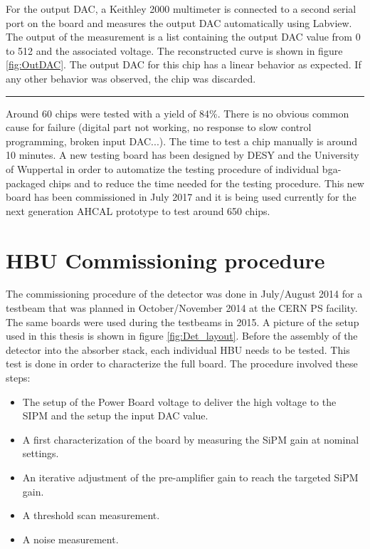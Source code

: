 For the output DAC, a Keithley 2000 multimeter is connected to a second serial port on the board and measures the output DAC automatically using Labview. The output of the measurement is a list containing the output DAC value from 0 to 512 and the associated voltage. The reconstructed curve is shown in figure \ref{fig:OutDAC}. The output DAC for this chip has a linear behavior as expected. If any other behavior was observed, the chip was discarded.

\begin{center}
  \rule{0.5\textwidth}{.4pt}
\end{center}

Around 60 chips were tested with a yield of 84\%. There is no obvious common cause for failure (digital part not working, no response to slow control programming, broken input DAC...). The time to test a chip manually is around 10 minutes. A new testing board has been designed by DESY and the University of Wuppertal in order to automatize the testing procedure of individual \acrshort{bga}-packaged chips \cite{AHCALMain2016_Amine} and to reduce the time needed for the testing procedure. This new board has been commissioned in July 2017 and it is being used currently for the next generation AHCAL prototype to test around 650 chips.

\section{HBU Commissioning procedure}

The commissioning procedure of the detector was done in July/August 2014 for a testbeam that was planned in October/November 2014 at the CERN PS facility. The same boards were used during the testbeams in 2015. A picture of the setup used in this thesis is shown in figure \ref{fig:Det_layout}. Before the assembly of the detector into the absorber stack, each individual HBU needs to be tested. This test is done in order to characterize the full board. The procedure involved these steps:

\begin{itemize}
  \item The setup of the Power Board voltage to deliver the high voltage to the SIPM and the setup the input DAC value.
  \item A first characterization of the board by measuring the SiPM gain at nominal settings.
  \item An iterative adjustment of the pre-amplifier gain to reach the targeted SiPM gain.
  \item A threshold scan measurement.
  \item A noise measurement.
\end{itemize}

